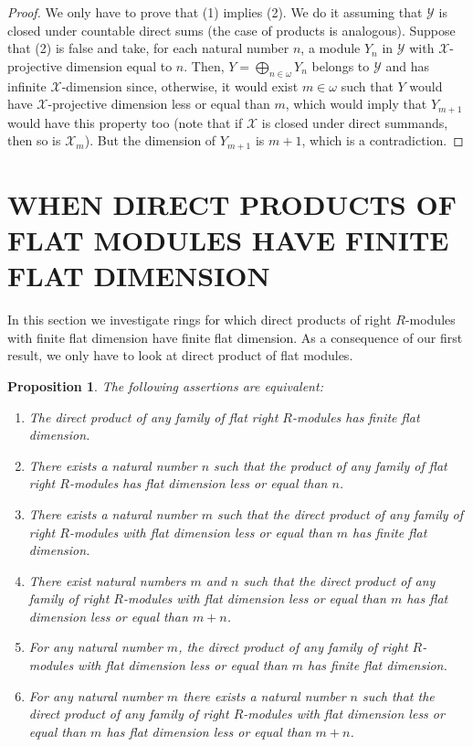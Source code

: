 \documentclass[a4paper,10pt]{amsart}
\newtheorem{proposition}[definition]{Proposition}
\begin{document}
\begin{proof}
  We only have to prove that (1) implies (2). We do it assuming that
  $\mathcal Y$ is closed under countable direct sums (the case of
  products is analogous). Suppose that (2) is false and take, for each
  natural number $n$, a module $Y_n$ in $\mathcal Y$ with $\mathcal
  X$-projective dimension equal to $n$. Then, $Y=\bigoplus_{n \in
    \omega}Y_n$ belongs to $\mathcal Y$ and has infinite $\mathcal
  X$-dimension since, otherwise, it would exist $m \in \omega$
  such that $Y$ would have $\mathcal X$-projective dimension less or
  equal than $m$, which would imply that $Y_{m+1}$ would have this
  property too (note that if $\mathcal X$ is closed under direct
  summands, then so is $\mathcal X_m$). But the dimension of $Y_{m+1}$
  is $m+1$, which is a contradiction.
\end{proof}

\section{WHEN DIRECT PRODUCTS OF FLAT MODULES HAVE FINITE FLAT DIMENSION}

In this section we investigate rings for which direct products of
right $R$-modules with finite flat dimension have finite flat
dimension. As a consequence of our first result, we only have to look
at direct product of flat modules.

\begin{proposition}\label{p:BoundedDimensionOfProducts}
  The following assertions are equivalent:
  \begin{enumerate}
  \item The direct product of any family of flat right $R$-modules has
    finite flat dimension.

  \item There exists a natural number $n$ such that the product of any
    family of flat right $R$-modules has flat dimension less or equal
    than $n$.

  \item There exists a natural number $m$ such that the direct product
    of any family of right $R$-modules with flat dimension less or
    equal than $m$ has finite flat dimension.

\item There exist natural numbers $m$ and $n$ such that the direct
  product of any family of right $R$-modules with flat dimension less
  or equal than $m$ has flat dimension less or equal than $m+n$.

  \item For any natural number $m$, the direct product of any family
    of right $R$-modules with flat dimension less or equal than $m$
    has finite flat dimension.

  \item For any natural number $m$ there exists a natural number $n$
    such that the direct product of any family of right $R$-modules
    with flat dimension less or equal than $m$ has flat dimension less
    or equal than $m+n$.
  \end{enumerate}
\end{proposition}
\end{document}
